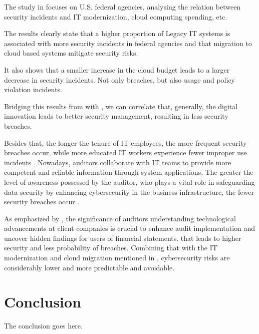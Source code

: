 \documentclass[journal]{IEEEtran}
\begin{document}
The study in \cite{bastos_1} focuses on U.S. federal agencies, analysing the relation between security incidents and IT modernization, cloud computing spending, etc. 

The results clearly state that a higher proportion of Legacy IT systems is associated with more security incidents in federal agencies and that migration to cloud based systems mitigate security risks. 

It also shows that a smaller increase in the cloud budget leads to a larger decrease in security incidents. Not only breaches, but also usage and policy violation incidents.

Bridging this results from \cite{bastos_1} with \cite{bastos_2}, we can correlate that, generally, the digital innovation leads to better security management, resulting in less security breaches.

Besides that, the longer the tenure of IT employees, the more frequent security breaches occur, while more educated IT workers experience fewer improper use incidents \cite{bastos_1}. Nowadays, auditors collaborate with IT teams to provide more competent and reliable information through system applications. The greater the level of awareness possessed by the auditor, who plays a vital role in safeguarding data security by enhancing cybersecurity in the business infrastructure, the fewer security breaches occur \cite{bastos_2}.

As emphasized by \cite{bastos_2}, the significance of auditors understanding technological advancements at client companies is crucial to enhance audit implementation and uncover hidden findings for users of financial statements. that leads to higher security and less probability of breaches. Combining that with the IT modernization and cloud migration mentioned in \cite{bastos_1}, cybersecurity risks are considerably lower and more predictable and avoidable.


\section{Conclusion}
The conclusion goes here.





\end{document}

